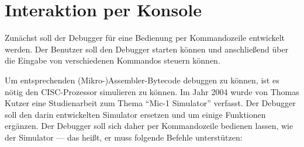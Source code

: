 \chapter{Interaktion per Konsole}
\label{bed-konsole}
Zunächst soll der Debugger für eine Bedienung per Kommandozeile entwickelt werden. Der Benutzer soll den Debugger starten können und anschließend über die Eingabe von verschiedenen Kommandos steuern können.

Um entsprechenden (Mikro-)Assembler-Bytecode debuggen zu können, ist es nötig den CISC-Prozessor simulieren zu können. Im Jahr 2004 wurde von Thomas Kutzer eine Studienarbeit zum Thema ``Mic-1 Simulator'' verfasst. Der Debugger soll den darin entwickelten Simulator ersetzen und um einige Funktionen ergänzen. Der Debugger soll sich daher per Kommandozeile bedienen lassen, wie der Simulator --- das heißt, er muss folgende Befehle unterstützen:

